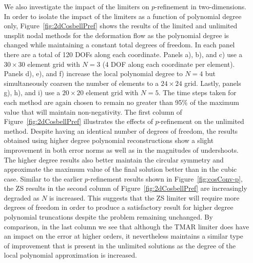 \documentclass{ametsoc}
\begin{document}
We also investigate the impact of the limiters on $p$-refinement in two-dimensions. In order to isolate the impact of the limiters as a function of polynomial degree only, Figure~\ref{fig:2dCosbellPref} shows the results of the limited and unlimited unsplit nodal methods for the deformation flow as the polynomial degree is changed while maintaining a constant total degrees of freedom. In each panel there are a total of 120 DOFs along each coordinate. Panels a), b), and c) use a $30 \times 30$ element grid with $N=3$ (4 DOF along each coordinate per element). Panels d), e), and f) increase the local polynomial degree to $N=4$ but simultaneously coarsen the number of elements to a $24 \times 24$ grid. Lastly, panels g), h), and i) use a $20 \times 20$ element grid with $N=5$. The time steps taken for each method are again chosen to remain no greater than 95\% of the maximum value that will maintain non-negativity. The first column of Figure~\ref{fig:2dCosbellPref} illustrates the effects of $p$-refinement on the unlimited method. Despite having an identical number of degrees of freedom, the results obtained using higher degree polynomial reconstructions show a slight improvement in both error norms as well as in the magnitudes of undershoots. The higher degree results also better maintain the circular symmetry and approximate the maximum value of the final solution better than in the cubic case. Similar to the earlier $p$-refinement results shown in Figure~\ref{fig:cosConv-p}, the ZS results in the second column of Figure~\ref{fig:2dCosbellPref} are increasingly degraded as $N$ is increased. This suggests that the ZS limiter will require more degrees of freedom in order to produce a satisfactory result for higher degree polynomial truncations despite the problem remaining unchanged. By comparison, in the last column we see that although the TMAR limiter does have an impact on the error at higher orders, it nevertheless maintains a similar type of improvement that is present in the unlimited solutions as the degree of the local polynomial approximation is increased.
\end{document}
